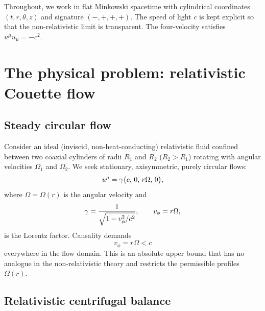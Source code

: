 Throughout, we work in flat Minkowski spacetime with cylindrical
coordinates $(t,r,\theta,z)$ and signature $(-,+,+,+)$.  The speed
of light $c$ is kept explicit so that the non-relativistic limit is
transparent.  The four-velocity satisfies $u^{\mu}u_{\mu}=-c^{2}$.

\section{The physical problem: relativistic Couette flow}
\label{sec:rel-7-65}

\subsection{Steady circular flow}
\label{sec:rel-7-65a}

Consider an ideal (inviscid, non-heat-conducting) relativistic fluid
confined between two coaxial cylinders of radii $R_{1}$ and
$R_{2}$ ($R_{2}>R_{1}$) rotating with angular velocities $\Omega_{1}$
and $\Omega_{2}$.  We seek stationary, axisymmetric, purely circular
flows:
\begin{equation}
\label{eq:rel-7-1}
u^{\mu} = \gamma\bigl(c,\,0,\,r\Omega,\,0\bigr),
\end{equation}
where $\Omega=\Omega(r)$ is the angular velocity and
\begin{equation}
\label{eq:rel-7-2}
\gamma = \frac{1}{\sqrt{1-v_{\phi}^{2}/c^{2}}},\qquad
v_{\phi}=r\Omega,
\end{equation}
is the Lorentz factor.  Causality demands
\begin{equation}
\label{eq:rel-7-3}
\boxed{v_{\phi}=r\Omega < c}
\end{equation}
everywhere in the flow domain.  This is an absolute upper bound that
has no analogue in the non-relativistic theory and restricts the
permissible profiles $\Omega(r)$.

\subsection{Relativistic centrifugal balance}
\label{sec:rel-7-65b}

